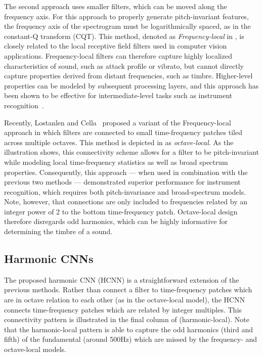 \documentclass{article}
\begin{document}
The second approach uses smaller filters, which can be moved along the frequency axis.
For this approach to properly generate pitch-invariant features, the frequency axis of the spectrogram must be logarithmically spaced, as in the constant-Q transform (CQT).
This method, denoted as \emph{Frequency-local} in , is closely related to the local receptive field filters used in computer vision applications.
Frequency-local filters can therefore capture highly localized characteristics of sound, such as attack profile or vibrato, but cannot directly capture properties derived from distant frequencies, such as timbre.
Higher-level properties can be modeled by subsequent processing layers, and this approach has been shown to be effective for intermediate-level tasks such as instrument recognition~\cite{mcfee2015_augmentation}.


Recently, Lostanlen and Cella~\cite{lostanlen2016} proposed a variant of the Frequency-local approach in which filters are connected to small time-frequency patches tiled across multiple octaves.
This method is depicted in  as \emph{octave-local}.
As the illustration shows, this connectivity scheme allows for a filter to be pitch-invariant while modeling local time-frequency statistics as well as broad spectrum properties.
Consequently, this approach --- when used in combination with the previous two methods --- demonstrated superior performance for instrument recognition, which requires both pitch-invariance and broad-spectrum models.
Note, however, that connections are only included to frequencies related by an integer power of 2 to the bottom time-frequency patch.
Octave-local design therefore disregards odd harmonics, which can be highly informative for determining the timbre of a sound.


\subsection{Harmonic CNNs}

The proposed harmonic CNN (HCNN) is a straightforward extension of the previous methods.
Rather than connect a filter to time-frequency patches which are in octave relation to each other (as in the octave-local model), the HCNN connects time-frequency patches which are related by integer multiples.
This connectivity pattern is illustrated in the final column of  (harmonic-local).
Note that the harmonic-local pattern is able to capture the odd harmonics (third and fifth)  of the fundamental (around 500Hz) which are missed by the frequency- and octave-local models.
\end{document}
